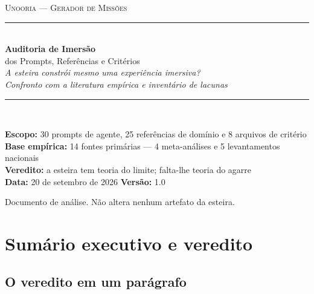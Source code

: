 \documentclass[11pt,a4paper]{article}
\begin{document}
\begin{titlepage}
\centering
\vspace*{2.5cm}

{\color{SteelBlue}\large\scshape Unooria --- Gerador de Miss\~oes}\\[0.4cm]
{\color{BorderGray}\rule{0.8\textwidth}{1.2pt}}\\[1.0cm]

{\Huge\bfseries\color{NavyBlue} Auditoria de Imers\~ao}\\[0.5cm]
{\LARGE\color{NavyBlue} dos Prompts, Refer\^encias e Crit\'erios}\\[1.2cm]

{\large\itshape A esteira constr\'oi mesmo uma experi\^encia imersiva?}\\[0.3cm]
{\large\itshape Confronto com a literatura emp\'irica e invent\'ario de lacunas}\\[1.5cm]

{\color{BorderGray}\rule{0.8\textwidth}{0.6pt}}\\[1.0cm]

\begin{minipage}{0.8\textwidth}
\centering
\small
\textbf{Escopo:} 30 prompts de agente, 25 refer\^encias de dom\'inio e 8 arquivos de crit\'erio\\
\textbf{Base emp\'irica:} 14 fontes prim\'arias --- 4 meta-an\'alises e 5 levantamentos nacionais\\
\textbf{Veredito:} a esteira tem teoria do limite; falta-lhe teoria do agarre\\[0.6cm]
\textbf{Data:} 20 de setembro de 2026 \quad\textbullet\quad \textbf{Vers\~ao:} 1.0
\end{minipage}

\vfill
{\small\color{Charcoal} Documento de an\'alise. N\~ao altera nenhum artefato da esteira.}
\end{titlepage}

\tableofcontents
\newpage

\section{Sum\'ario executivo e veredito}

\subsection{O veredito em um par\'agrafo}
\end{document}

